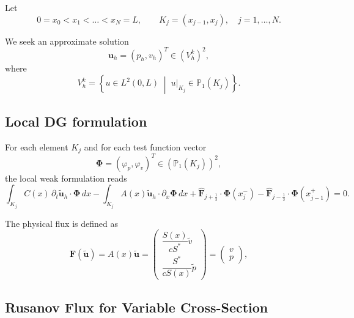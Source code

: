 \documentclass[11pt,a4paper]{report}
\theoremstyle{plain}
\theoremstyle{definition}
\begin{document}
Let
\begin{equation}
0 = x_0 < x_1 < \dots < x_N = L,
\qquad
K_j = (x_{j-1}, x_j), \quad j = 1,\dots,N.
\end{equation}

We seek an approximate solution
\begin{equation}
\mathbf{u}_h = (p_h, v_h)^T \in (V_h^k)^2,
\end{equation}
where
\begin{equation}
V_h^k =
\left\{
u \in L^2(0,L) \;\middle|\;
u|_{K_j} \in \mathbb{P}_1(K_j)
\right\}.
\end{equation}

\subsection{Local DG formulation}

For each element $K_j$ and for each test function vector
\begin{equation}
\boldsymbol{\Phi} = (\varphi_p, \varphi_v)^T \in (\mathbb{P}_1(K_j))^2,
\end{equation}
the local weak formulation reads
\begin{equation}
\int_{K_j} C(x)\, \partial_t \mathbf{\tilde{u}}_h \cdot \boldsymbol{\Phi}\, dx
-
\int_{K_j} A(x) \mathbf{\tilde{u}}_h \cdot \partial_x \boldsymbol{\Phi}\, dx
+
\widehat{\mathbf{F}}_{j+\frac12} \cdot \boldsymbol{\Phi}(x_j^-)
-
\widehat{\mathbf{F}}_{j-\frac12} \cdot \boldsymbol{\Phi}(x_{j-1}^+)
= 0.
\label{eq:dg_local_vector}
\end{equation}

The physical flux is defined as
\begin{equation}
\mathbf{F}(\mathbf{\tilde{u}}) = A(x) \mathbf{\tilde{u}}
=
\begin{pmatrix}
\dfrac{S(x)}{c S^*} \tilde{v} \\
\dfrac{S^*}{c S(x)} \tilde{p}
\end{pmatrix}
=
\begin{pmatrix}
v \\
p
\end{pmatrix},
\end{equation}

\subsection{Rusanov Flux for Variable Cross-Section}
\end{document}
